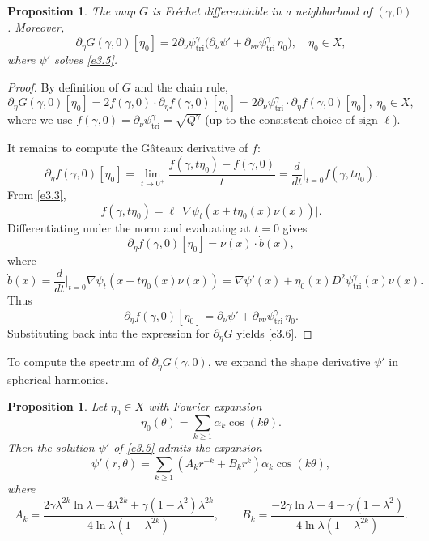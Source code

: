 \documentclass[reqno]{amsart}
\numberwithin{equation}{section}
\newtheorem{proposition}[theorem]{Proposition}
\numberwithin{equation}{section}
\numberwithin{equation}{section}
\begin{document}
\begin{proposition}\label{pro-3.3}
The map \(G\) is Fr\'{e}chet differentiable in a neighborhood of \((\gamma, 0)\). Moreover,
\begin{equation}\label{e3.6}
\partial_\eta G(\gamma, 0)[\eta_0] = 2 \partial_\nu \psi^\gamma_\mathrm{tri} \bigl( \partial_\nu \psi' + \partial_{\nu\nu} \psi^\gamma_\mathrm{tri} \, \eta_0 \bigr), \quad \eta_0 \in X,
\end{equation}
where \(\psi'\) solves \eqref{e3.5}.
\end{proposition}

\begin{proof}
By definition of \(G\) and the chain rule,
$$
\partial_\eta G(\gamma,0)[\eta_0] = 2 f(\gamma,0) \cdot \partial_\eta f(\gamma,0)[\eta_0] = 2 \partial_\nu \psi^\gamma_\mathrm{tri} \cdot \partial_\eta f(\gamma,0)[\eta_0],~\eta_0\in X,
$$
where we use \(f(\gamma,0) = \partial_\nu \psi^\gamma_\mathrm{tri} = \sqrt{Q^\gamma}\) (up to the consistent choice of sign \(\ell\)).

It remains to compute the Gâteaux derivative of \(f\):
$$
\partial_\eta f(\gamma,0)[\eta_0] = \lim_{t \to 0^+} \frac{f(\gamma, t\eta_0) - f(\gamma,0)}{t} = \frac{d}{dt}\Big|_{t=0} f(\gamma, t\eta_0).
$$
From \eqref{e3.3},
$$
f(\gamma, t\eta_0) = \ell \, \bigl|\nabla \psi_t(x + t\eta_0(x)\nu(x))\bigr|.
$$
Differentiating under the norm and evaluating at \(t=0\) gives
\[
\partial_\eta f(\gamma,0)[\eta_0] = \nu(x) \cdot \dot{b}(x),
\]
where
\[
\dot{b}(x) = \frac{d}{dt}\Big|_{t=0} \nabla \psi_t(x + t\eta_0(x)\nu(x)) = \nabla \psi'(x) + \eta_0(x) D^2 \psi^\gamma_\mathrm{tri}(x) \nu(x).
\]
Thus
$$
\partial_\eta f(\gamma,0)[\eta_0] = \partial_\nu \psi' + \partial_{\nu\nu} \psi^\gamma_\mathrm{tri} \, \eta_0.
$$
Substituting back into the expression for \(\partial_\eta G\) yields \eqref{e3.6}.
\end{proof}

To compute the spectrum of \(\partial_\eta G(\gamma, 0)\), we expand the shape derivative \(\psi'\) in spherical harmonics.

\begin{proposition}\label{pro-3.4}
Let \(\eta_0 \in X\) with Fourier expansion
\[
\eta_0(\theta) = \sum_{k \geq 1} \alpha_k \cos(k\theta).
\]
Then the solution \(\psi'\) of \eqref{e3.5} admits the expansion
\[
\psi'(r, \theta) = \sum_{k \geq 1}\left (A_k r^{-k} + B_k r^k\right) \alpha_k \cos(k\theta),
\]
where
\[
A_k = \frac{2\gamma \lambda^{2k} \ln\lambda + 4\lambda^{2k} + \gamma(1 - \lambda^2)\lambda^{2k}}{4\ln\lambda (1 - \lambda^{2k})}, \qquad
B_k = \frac{-2\gamma \ln\lambda - 4 - \gamma(1 - \lambda^2)}{4\ln\lambda (1 - \lambda^{2k})}.
\]
\end{proposition}
\end{document}
